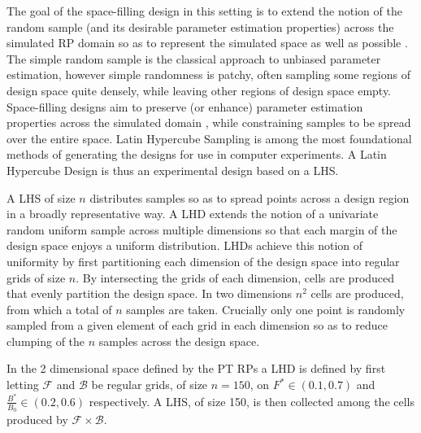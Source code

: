 %
The goal of the space-filling design in this setting is to extend the notion of the
random sample (and its desirable parameter estimation properties) across the
simulated RP domain so as to represent the simulated space as well as possible \cite{gramacy_surrogates_2020}.
The simple random sample is the classical approach to unbiased parameter
estimation, however simple randomness is patchy, often sampling some regions
of design space quite densely, while leaving other regions of design space empty.
Space-filling designs aim to preserve (or enhance) parameter estimation properties
across the simulated domain \cite{devon_lin_latin_2015, stein_large_1987},
while constraining samples to be spread over the entire space.
Latin Hypercube Sampling \cite[LHS]{mckay_comparison_2000} is among the most
foundational methods of generating the designs for use in computer experiments. 
A Latin Hypercube Design \cite[LHD]{santner_design_2003} is thus an experimental 
design based on a LHS. 

A LHS of size $n$ distributes samples so as to spread points across a design 
region in a broadly representative way. A LHD extends the notion of a 
univariate random uniform sample across multiple dimensions so that each 
margin of the design space enjoys a uniform distribution.
%
LHDs achieve this notion of uniformity by first partitioning each dimension
of the design space into regular grids of size $n$. By intersecting the grids
of each dimension, cells are produced that evenly partition the design space.
In two dimensions $n^2$ cells are produced, from which a total of $n$ samples
are taken. Crucially only one point is randomly sampled from a given element of
each grid in each dimension so as to reduce clumping of the $n$ samples across
the design space.

%
In the 2 dimensional space defined by the PT RPs a LHD is defined by first
letting $\mathcal{F}$ and $\mathcal{B}$ be regular grids, of size $n=150$, on
\mbox{$F^*\in(0.1, 0.7)$} and \mbox{$\frac{B^*}{B_0}\in(0.2, 0.6)$}
respectively. A LHS, of size 150, is then collected among the cells produced 
by $\mathcal{F}\times\mathcal{B}$. 

